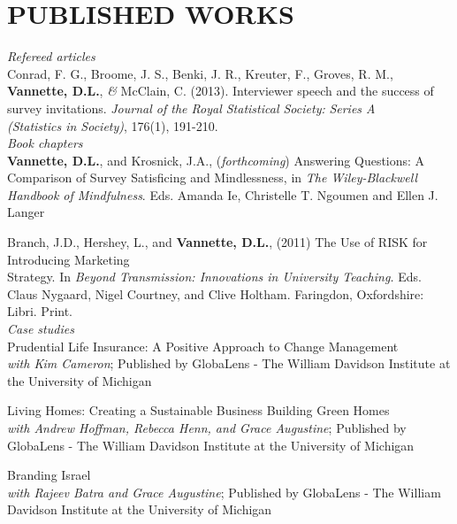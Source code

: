 \documentclass[a4paper,10pt]{article} %
\newcommand{\amper}{{\fontspec[Scale=.95]{Hoefler Text}\selectfont\itshape\&}}
\begin{document}

\section{\small PUBLISHED WORKS}

\textit{Refereed articles} \medskip\\
\noindent Conrad, F. G., Broome, J. S., Benki, J. R., Kreuter, F., Groves, R. M., \textbf{Vannette, D.L.}, \amper{}  McClain, C. (2013). Interviewer speech and the success of survey invitations. \textit {Journal of the Royal Statistical Society:}
 \textit{Series A \\ (Statistics in Society)}, 176(1), 191-210.\\


\textit{Book chapters} \medskip\\
\textbf{Vannette, D.L.}, and Krosnick, J.A., (\textit{forthcoming}) Answering Questions: A Comparison of Survey Satisficing and Mindlessness, in \textit{The Wiley-Blackwell Handbook of Mindfulness}. Eds. Amanda Ie, Christelle T. Ngoumen and Ellen J. Langer

Branch, J.D., Hershey, L., and \textbf{Vannette, D.L.}, (2011) The Use of RISK\textregistered{} for Introducing Marketing \\ Strategy. In \textit{Beyond Transmission: Innovations in University Teaching.} Eds. Claus Nygaard, Nigel Courtney, and Clive Holtham. Faringdon, Oxfordshire: Libri. Print.\\


\textit{Case studies} \medskip \\
Prudential Life Insurance: A Positive Approach to Change Management \\ 
\textit{with Kim Cameron}; Published by GlobaLens - The William Davidson Institute at the University of Michigan

Living Homes: Creating a Sustainable Business Building Green Homes \\
\textit{with Andrew Hoffman, Rebecca Henn, and Grace Augustine}; Published by GlobaLens - The William Davidson Institute at the University of Michigan

Branding Israel \\
\textit{with Rajeev Batra and Grace Augustine}; Published by GlobaLens - The William Davidson Institute at the University of Michigan
\end{document}
